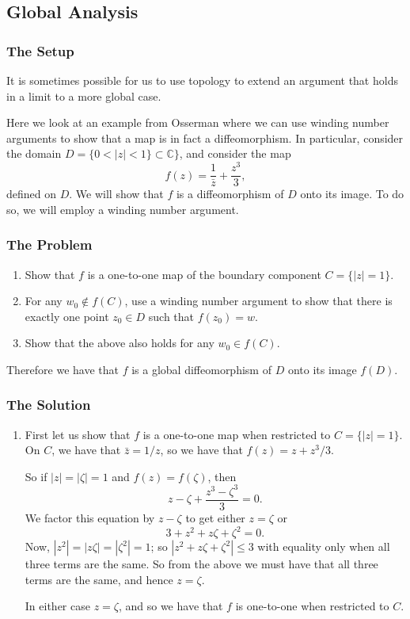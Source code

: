 \subsection{Global Analysis}
\subsubsection*{The Setup}

It is sometimes possible for us to use topology to extend an argument that holds in a limit to a more global case.

Here we look at an example from Osserman \cite{Osserman} where we can use winding number arguments to show that
a map is in fact a diffeomorphism. In particular, consider the domain \(D = \{0 < |z| < 1\} \subset \mathbb C\}\), 
and consider the map 
\begin{equation}
f(z) = \frac{1}{\bar z} + \frac{z^3}{3},
\end{equation} 
defined on \(D\). We will show that \(f\) is a diffeomorphism of \(D\) onto its image. To do so, we will employ
a winding number argument.

\subsubsection*{The Problem}
\begin{enumerate}
\item Show that \(f\) is a one-to-one map of the boundary component \(C = \{|z| = 1\}\).
\item For any \(w_0 \not \in f(C)\), use a winding number argument to show that there is exactly one point
\(z_0 \in D\) such that \(f(z_0) = w\).
\item Show that the above also holds for any \(w_0 \in f(C)\).
\end{enumerate}
Therefore we have that \(f\) is a global diffeomorphism of \(D\) onto its image \(f(D)\).

\subsubsection*{The Solution}
\begin{enumerate}
\item First let us show that \(f\) is a one-to-one map when restricted to \(C = \{|z| = 1\}\). On \(C\),
we have that \(\bar z = 1 / z\), so we have that \(f(z) = z + z^3 / 3\). 

So if \(|z| = |\zeta| = 1\) and \(f(z) = f(\zeta)\), then 
\begin{equation}
z - \zeta + \frac{z^3 - \zeta^3}{3} = 0. 
\end{equation}
We factor this equation by \(z - \zeta\) to get either \(z =\zeta\) or
\begin{equation}
3 + z^2 + z\zeta + \zeta^2 = 0.
\end{equation}
Now, \(|z^2| = |z\zeta| = |\zeta^2| = 1\); so \(|z^2 + z\zeta + \zeta^2| \leq 3\) with equality only when
all three terms are the same. So from the above we must have that all three terms are the same, and hence
\(z = \zeta\).

In either case \(z = \zeta\), and so we have that \(f\) is one-to-one when restricted to \(C\).
\end{enumerate}
